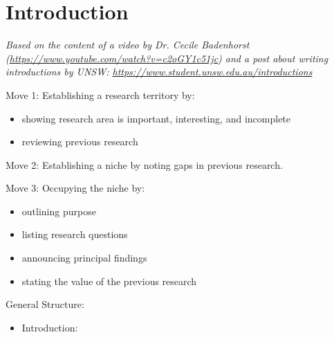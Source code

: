 \chapter{Introduction}
\label{chap:introduction}

\begin{writingdirectives}

      \item \textit{Based on the content of a video by Dr. Cecile Badenhorst
            (\url{https://www.youtube.com/watch?v=c2oGY1c51jc}) and a post about
            writing introductions by UNSW:
            \url{https://www.student.unsw.edu.au/introductions}}

      \item Move 1: Establishing a research territory by:
      \begin{itemize}

            \item showing research area is important, interesting, and
                  incomplete

            \item reviewing previous research

      \end{itemize}

      \item Move 2: Establishing a niche by noting gaps in previous research.

      \item Move 3: Occupying the niche by:
      \begin{itemize}

            \item outlining purpose

            \item listing research questions

            \item announcing principal findings

            \item stating the value of the previous research

      \end{itemize}

      \item General Structure:
      \begin{itemize}

            \item Introduction:
                  \begin{itemize}


\end{itemize}
\end{itemize}
\end{writingdirectives}
